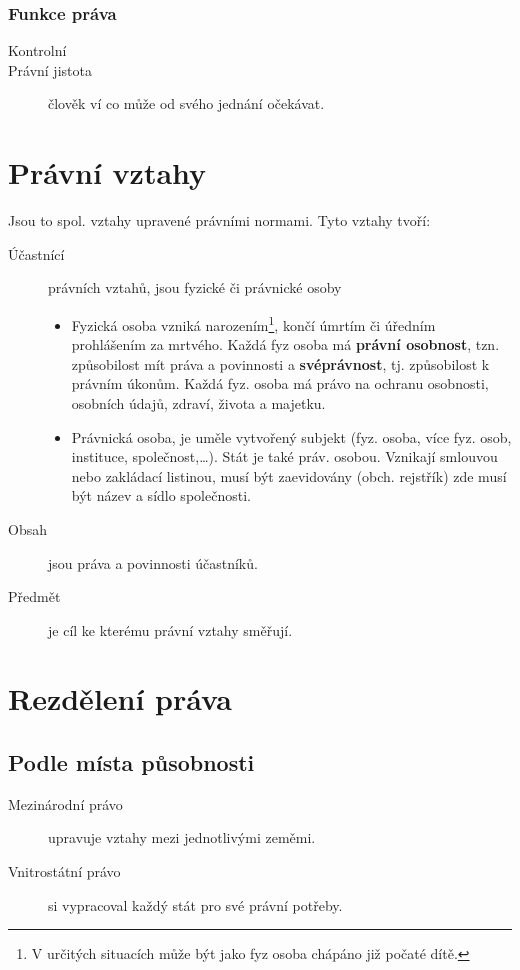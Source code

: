 \documentclass[10pt,a4paper,
twoside,%
]{report}
\begin{document}
\subsubsection*{Funkce práva}
\begin{description}
\item[Kontrolní]
\item[Právní jistota] člověk ví co může od svého jednání očekávat.
\end{description}

\section{Právní vztahy}
Jsou to spol. vztahy upravené právními normami. 
Tyto vztahy tvoří:
\begin{description}
\item[Účastnící] právních vztahů, jsou fyzické či právnické osoby
\begin{itemize}
\item Fyzická osoba vzniká narozením\footnote{V určitých situacích může být jako fyz osoba chápáno již počaté dítě.}, končí úmrtím či úředním prohlášením za mrtvého. Každá fyz osoba má \textbf{právní osobnost}, tzn. \textsf{způsobilost mít práva a povinnosti} a \textbf{svéprávnost}, tj. \textsf{způsobilost k právním úkonům}. Každá fyz. osoba má právo na ochranu osobnosti, osobních údajů, zdraví, života a majetku.

\item Právnická osoba, je uměle vytvořený subjekt (fyz. osoba, více fyz. osob, instituce, společnost,\dots). Stát je také práv. osobou. Vznikají smlouvou nebo zakládací listinou, musí být zaevidovány (obch. rejstřík) zde musí být název a sídlo společnosti.
\end{itemize}

\item[Obsah] jsou práva a povinnosti účastníků.

\item[Předmět] je cíl ke kterému právní vztahy směřují.

\end{description}
\section{Rezdělení práva}
\subsection{Podle místa působnosti}
\begin{description}
\item[Mezinárodní právo] upravuje vztahy mezi jednotlivými zeměmi.
\item[Vnitrostátní právo] si vypracoval každý stát pro své právní potřeby.
\end{description}
\end{document}
